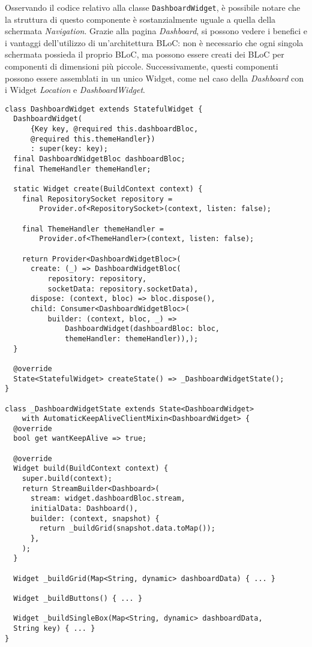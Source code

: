 Osservando il codice relativo alla classe \verb|DashboardWidget|, è possibile notare che la struttura di  questo componente è sostanzialmente uguale a quella della schermata \textit{Navigation}. Grazie alla pagina \textit{Dashboard}, si possono vedere i benefici e i vantaggi dell'utilizzo di un'architettura BLoC: non è necessario che ogni singola schermata possieda il proprio BLoC, ma possono essere creati dei BLoC per componenti di dimensioni più piccole. Successivamente, questi componenti possono essere assemblati in un unico Widget, come nel caso della \textit{Dashboard} con i Widget \textit{Location} e \textit{DashboardWidget}.

\begin{lstlisting}
class DashboardWidget extends StatefulWidget {
  DashboardWidget(
      {Key key, @required this.dashboardBloc, 
      @required this.themeHandler})
      : super(key: key);
  final DashboardWidgetBloc dashboardBloc;
  final ThemeHandler themeHandler;

  static Widget create(BuildContext context) {
    final RepositorySocket repository =
        Provider.of<RepositorySocket>(context, listen: false);

    final ThemeHandler themeHandler =
        Provider.of<ThemeHandler>(context, listen: false);

    return Provider<DashboardWidgetBloc>(
      create: (_) => DashboardWidgetBloc(
          repository: repository, 
          socketData: repository.socketData),
      dispose: (context, bloc) => bloc.dispose(),
      child: Consumer<DashboardWidgetBloc>(
          builder: (context, bloc, _) =>
              DashboardWidget(dashboardBloc: bloc, 
              themeHandler: themeHandler)),);
  }

  @override
  State<StatefulWidget> createState() => _DashboardWidgetState();
}

class _DashboardWidgetState extends State<DashboardWidget>
    with AutomaticKeepAliveClientMixin<DashboardWidget> {
  @override
  bool get wantKeepAlive => true;

  @override
  Widget build(BuildContext context) {
    super.build(context);
    return StreamBuilder<Dashboard>(
      stream: widget.dashboardBloc.stream,
      initialData: Dashboard(),
      builder: (context, snapshot) {
        return _buildGrid(snapshot.data.toMap());
      },
    );
  }

  Widget _buildGrid(Map<String, dynamic> dashboardData) { ... }

  Widget _buildButtons() { ... }

  Widget _buildSingleBox(Map<String, dynamic> dashboardData, 
  String key) { ... }
}
\end{lstlisting}

